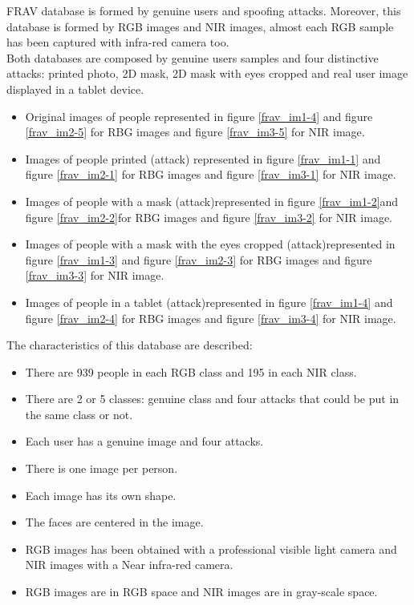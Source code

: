 FRAV database is formed by genuine users and spoofing attacks. Moreover, this database is formed by RGB images and NIR images, almost each RGB sample has been captured with infra-red camera too.\\

Both databases are composed by genuine users samples and four distinctive attacks: printed photo, 2D mask, 2D mask with eyes cropped and real user image displayed in a tablet device.\\

\begin{itemize}[itemsep=2pt,topsep=8pt,parsep=0pt,partopsep=20pt]
 \item Original images of people represented in figure \ref{frav_im1-4} and figure \ref{frav_im2-5} for RBG images and figure \ref{frav_im3-5} for NIR image.
 \item Images of people printed (attack) represented in figure \ref{frav_im1-1} and figure \ref{frav_im2-1} for RBG images and figure \ref{frav_im3-1} for NIR image.
 \item Images of people with a mask (attack)represented in figure \ref{frav_im1-2}and figure \ref{frav_im2-2}for RBG images and figure \ref{frav_im3-2} for NIR image.
 \item Images of people with a mask with the eyes cropped (attack)represented in figure \ref{frav_im1-3} and figure \ref{frav_im2-3} for RBG images and figure \ref{frav_im3-3} for NIR image.
 \item Images of people in a tablet (attack)represented in figure \ref{frav_im1-4} and figure \ref{frav_im2-4} for RBG images and figure \ref{frav_im3-4} for NIR image.\\
 \end{itemize}

The characteristics of this database are described:
\begin{itemize}[itemsep=2pt,topsep=8pt,parsep=0pt,partopsep=20pt]
\item There are 939 people in each RGB class and 195 in each NIR class.
\item There are 2 or 5 classes: genuine class and four attacks that could be put in the same class or not.
\item Each user has a genuine image and four attacks.
\item There is one image per person.
\item Each image has its own shape.
\item The faces are centered in the image.
\item RGB images has been obtained with a professional visible light camera and NIR images with a Near infra-red camera.
\item RGB images are in RGB space and NIR images are in gray-scale space.
\end{itemize}

